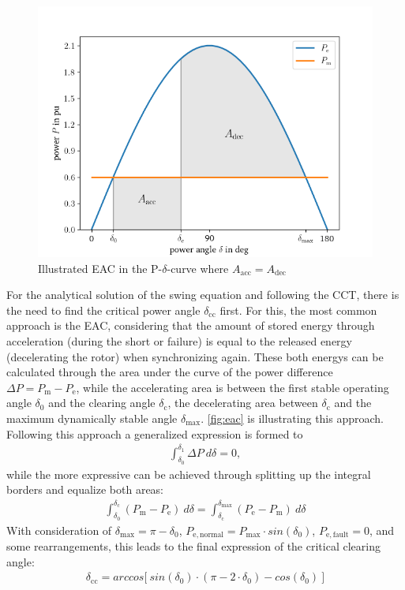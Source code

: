 \begin{figure}
        \centering
        \includegraphics[width=.6\textwidth]{python/plots/eac.png}
        \caption{Illustrated \acf{EAC} in the P-$\delta$-curve where $A_\mathrm{acc}=A_\mathrm{dec}$}
        \label{fig:eac}
\end{figure}
For the analytical solution of the swing equation and following the \acs{CCT}, there is the need to find the critical power angle $\delta_\mathrm{cc}$ first. For this, the most common approach is the \acf{EAC}, considering that the amount of stored energy through acceleration (during the short or failure) is equal to the released energy (decelerating the rotor) when synchronizing again. These both energys can be calculated through the area under the curve of the power difference $\Delta P=P_\mathrm{m}-P_\mathrm{e}$, while the accelerating area is between the first stable operating angle $\delta_\mathrm{0}$ and the clearing angle $\delta_\mathrm{c}$, the decelerating area between $\delta_\mathrm{c}$ and the maximum dynamically stable angle $\delta_\mathrm{max}$. \autoref{fig:eac} is illustrating this approach. Following this approach a generalized expression is formed to
\begin{align}
        \int_{\delta_\mathrm{0}}^{\delta_\mathrm{1}}\Delta P~d\delta = 0 \label{eq:gen-eac},
\end{align}
while the more expressive can be achieved through splitting up the integral borders and equalize both areas:
\begin{align}
        \int_{\delta_\mathrm{0}}^{\delta_\mathrm{c}}(P_\mathrm{m}-P_\mathrm{e})~d\delta = \int_{\delta_\mathrm{c}}^{\delta_\mathrm{max}}(P_\mathrm{e}-P_\mathrm{m})~d\delta \label{eq:big-eac}
\end{align}
With consideration of $\delta_\mathrm{max}=\pi-\delta_\mathrm{0}$, $P_\mathrm{e,normal}=P_\mathrm{max} \cdot sin(\delta_\mathrm{0})$, $P_\mathrm{e,fault}=0$, and some rearrangements, this leads to the final expression of the critical clearing angle:
\begin{align}
        \delta_\mathrm{cc}=arccos\big[~sin(\delta_\mathrm{0}) \cdot (\pi-2 \cdot \delta_\mathrm{0})-cos(\delta_\mathrm{0})~\big] \label{eq:delta-cc}
\end{align}

